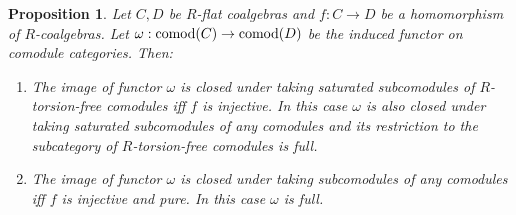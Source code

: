 \documentclass[12pt]{amsart}
\theoremstyle{plain}
\newtheorem{prop}[thm]{Proposition}
\theoremstyle{definition}
\numberwithin{thm}{section}
\def\comod{{\rm comod}}
\begin{document}
\begin{prop}\label{prop9b}
Let $C,D$ be $R$-flat coalgebras  and  
$f:C\to D$ be a homomorphism of $R$-coalgebras. 
Let $\omega:\comod(C)\to\comod(D)$ be the induced functor on comodule categories.
Then:
\begin{enumerate}
\item The image of functor $\omega$ is closed 
under taking saturated subcomodules of $R$-torsion-free comodules iff $f$ is injective. In this case $\omega$ is also closed under taking saturated subcomodules of any comodules and its restriction to the subcategory of $R$-torsion-free comodules is full.

\item 
The image of functor $\omega$ is closed 
under taking subcomodules of any 
comodules iff $f$ is injective and pure. In 
this case $\omega$ is full.
\end{enumerate}
\end{prop}
\end{document}
